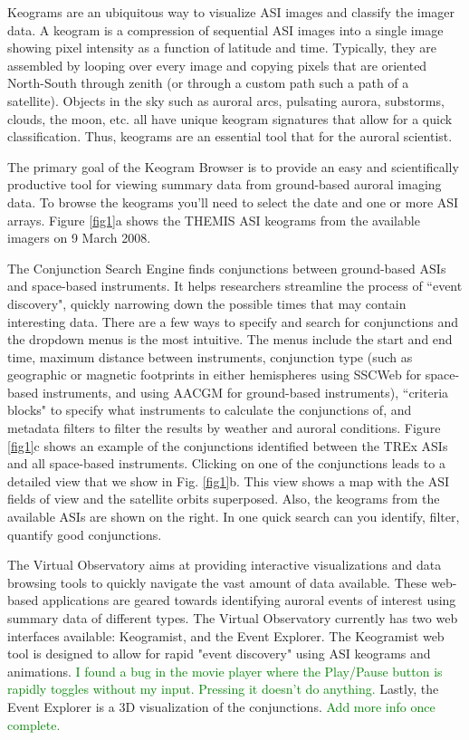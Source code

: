 \documentclass[draft]{agujournal2019}
\begin{document}
Keograms are an ubiquitous way to visualize ASI images and classify the imager data. A keogram is a compression of sequential ASI images into a single image showing pixel intensity as a function of latitude and time. Typically, they are assembled by looping over every image and copying pixels that are oriented North-South through zenith (or through a custom path such a path of a satellite). Objects in the sky such as auroral arcs, pulsating aurora, substorms, clouds, the moon, etc. all have unique keogram signatures that allow for a quick classification. Thus, keograms are an essential tool that for the auroral scientist.

The primary goal of the Keogram Browser is to provide an easy and scientifically productive tool for viewing summary data from ground-based auroral imaging data. To browse the keograms you'll need to select the date and one or more ASI arrays. Figure \ref{fig1}a shows the THEMIS ASI keograms from the available imagers on 9 March 2008.

The Conjunction Search Engine finds conjunctions between ground-based ASIs and space-based instruments. It helps researchers streamline the process of ``event discovery", quickly narrowing down the possible times that may contain interesting data. There are a few ways to specify and search for conjunctions and the dropdown menus is the most intuitive. The menus include the start and end time, maximum distance between instruments, conjunction type (such as geographic or magnetic footprints in either hemispheres using SSCWeb for space-based instruments, and using AACGM \cite{Shepherd2014} for ground-based instruments), ``criteria blocks" to specify what instruments to calculate the conjunctions of, and metadata filters to filter the results by weather and auroral conditions. Figure \ref{fig1}c shows an example of the conjunctions identified between the TREx ASIs and all space-based instruments. Clicking on one of the conjunctions leads to a detailed view that we show in Fig. \ref{fig1}b. This view shows a map with the ASI fields of view and the satellite orbits superposed. Also, the keograms from the available ASIs are shown on the right. In one quick search can you identify, filter, quantify good conjunctions.

The Virtual Observatory aims at providing interactive visualizations and data browsing tools to quickly navigate the vast amount of data available. These web-based applications are geared towards identifying auroral events of interest using summary data of different types. The Virtual Observatory currently has two web interfaces available: Keogramist, and the Event Explorer. The Keogramist web tool is designed to allow for rapid "event discovery" using ASI keograms and animations. \textcolor{green}{I found a bug in the movie player where the Play/Pause button is rapidly toggles without my input. Pressing it doesn't do anything.} Lastly, the Event Explorer is a 3D visualization of the conjunctions. \textcolor{green}{Add more info once complete.}
\end{document}
